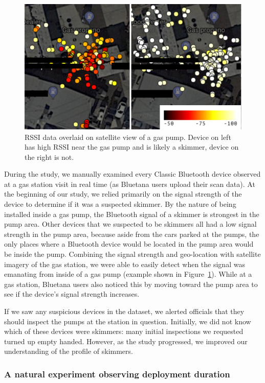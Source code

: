 \begin{figure}
\centering
\captionsetup{justification=centering}
\includegraphics[width=0.8\linewidth]{skimmer/fig/rssi_motivation.pdf}
\caption{
\label{fig:rssi}
  RSSI data overlaid on satellite view of a gas pump. Device on left has high RSSI near the gas pump and is likely a skimmer, device on the right is not. 
}
\end{figure}

During the study, we manually examined every Classic Bluetooth device observed
at a gas station visit in real time (as Bluetana users upload their scan data).
%
At the beginning of our study, we relied primarily on the signal strength of the device to determine if it was
a suspected skimmer.
%
By the nature of being installed inside a gas pump, the Bluetooth signal
of a skimmer is strongest in the pump area.
%
Other devices that we suspected to be skimmers all had a low signal strength
in the pump area, because aside from the cars parked at the pumps, the only
places where a Bluetooth device would be located in the pump area would be
inside the pump.
%
Combining the signal strength and geo-location with satellite
imagery of the gas station, we were able to easily detect when the signal was
emanating from inside of a gas pump (example shown in Figure~\ref{fig:rssi}).
%
While at a gas station, Bluetana users also noticed this by moving toward the
pump area to see if the device's signal strength increases.
%

If we saw any suspicious devices in the dataset, we alerted officials that they
should inspect the pumps at the station in question.
%
Initially, we did not know which of these devices were skimmers: many initial
inspections we requested turned up empty handed.
%
However, as the study progressed, we improved our understanding of the
profile of skimmers.

\subsubsection*{A natural experiment observing deployment duration}

